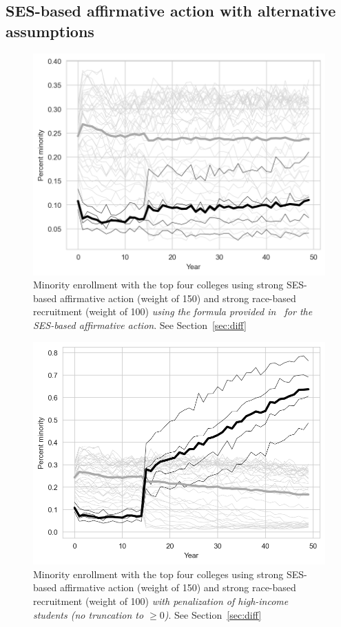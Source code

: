 \clearpage

\begin{appendices}

\section{SES-based affirmative action with alternative assumptions}

\begin{figure}[ht!]
  \centering
  \includegraphics[width=.79\textwidth]{figures/figC4_f1.png}
  \caption{Minority enrollment with the top four colleges using strong SES-based affirmative action (weight of 150) and strong race-based recruitment (weight of 100) \emph{using the formula provided in~\cite{reardon2018levels} for the SES-based affirmative action}. See Section~\ref{sec:diff}}
  \label{fig:c4_f1}
\end{figure}

\begin{figure}[ht!]
  \centering
  \includegraphics[width=.79\textwidth]{figures/figC4_pen.png}
  \caption{Minority enrollment with the top four colleges using strong SES-based affirmative action (weight of 150) and strong race-based recruitment (weight of 100) \emph{with penalization of high-income students (no truncation to $\geq 0$)}. See Section~\ref{sec:diff}}
  \label{fig:c4_pen}
\end{figure}


\end{appendices}
